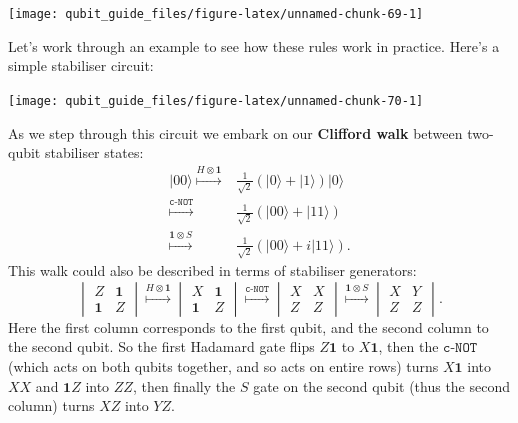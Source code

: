 \documentclass[fleqn,a4paper]{article}
\theoremstyle{definition}
\theoremstyle{definition}
\theoremstyle{definition}
\theoremstyle{definition}
\theoremstyle{remark}
\begin{document}
\begin{center}\texttt{[image: qubit\_guide\_files/figure-latex/unnamed-chunk-69-1]} \end{center}

Let's work through an example to see how these rules work in practice.
Here's a simple stabiliser circuit:

\begin{center}\texttt{[image: qubit\_guide\_files/figure-latex/unnamed-chunk-70-1]} \end{center}

As we step through this circuit we embark on our \textbf{Clifford walk} between two-qubit stabiliser states:
\[
  \begin{aligned}
    |00\rangle
    \overset{H\otimes\mathbf{1}}{\longmapsto}
    &\frac{1}{\sqrt{2}}(|0\rangle+|1\rangle)|0\rangle
  \\\overset{\texttt{c-NOT}}{\longmapsto}
    &\frac{1}{\sqrt{2}}(|00\rangle+|11\rangle)
  \\\overset{\mathbf{1}\otimes S}{\longmapsto}
    &\frac{1}{\sqrt{2}}(|00\rangle+i|11\rangle).
  \end{aligned}
\]
This walk could also be described in terms of stabiliser generators:
\[
  \begin{vmatrix}
    Z&\mathbf{1}
  \\\mathbf{1}&Z
  \end{vmatrix}
  \overset{H\otimes\mathbf{1}}{\longmapsto}
  \begin{vmatrix}
    X&\mathbf{1}
  \\\mathbf{1}&Z
  \end{vmatrix}
  \overset{\texttt{c-NOT}}{\longmapsto}
  \begin{vmatrix}
    X&X
  \\Z&Z
  \end{vmatrix}
  \overset{\mathbf{1}\otimes S}{\longmapsto}
  \begin{vmatrix}
    X&Y
  \\Z&Z
  \end{vmatrix}.
\]
Here the first column corresponds to the first qubit, and the second column to the second qubit.
So the first Hadamard gate flips \(Z\mathbf{1}\) to \(X\mathbf{1}\), then the \(\texttt{c-NOT}\) (which acts on both qubits together, and so acts on entire rows) turns \(X\mathbf{1}\) into \(XX\) and \(\mathbf{1}Z\) into \(ZZ\), then finally the \(S\) gate on the second qubit (thus the second column) turns \(XZ\) into \(YZ\).
\end{document}
